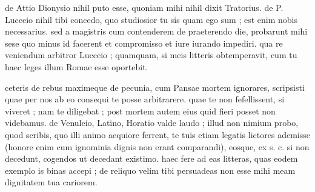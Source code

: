 de Attio Dionysio nihil puto esse, quoniam mihi nihil dixit Tratorius. de P. Lucceio nihil tibi concedo, quo studiosior tu sis quam ego sum ; est enim nobis necessarius. sed a magistris cum contenderem de praeterendo die, probarunt mihi sese quo minus id facerent et compromisso et iure iurando impediri. qua re veniendum arbitror Lucceio ; quamquam, si meis litteris obtemperavit, cum tu haec leges illum Romae esse oportebit.

 ceteris de rebus maximeque de pecunia, cum Pansae mortem ignorares, scripsisti quae per nos ab eo consequi te posse arbitrarere. quae te non fefellissent, si viveret ; nam te diligebat ; post mortem autem eius quid fieri posset non videbamus. de Venuleio, Latino, Horatio valde laudo ; illud non nimium probo, quod scribis, quo illi animo aequiore ferrent, te tuis etiam legatis lictores ademisse (honore enim cum ignominia dignis non erant comparandi), eosque, ex s. c. si non decedunt, cogendos ut decedant existimo. haec fere ad eas litteras, quas eodem exemplo is binas accepi ; de reliquo velim tibi persuadeas non esse mihi meam dignitatem tua cariorem.
